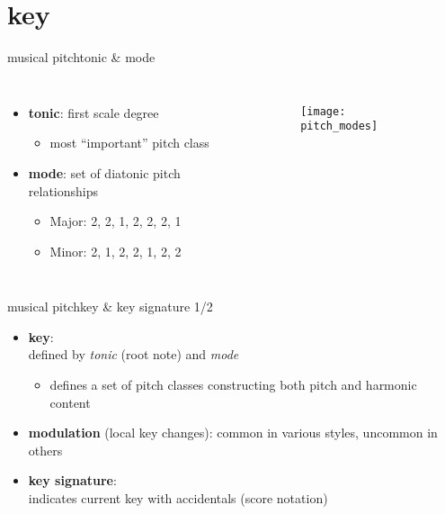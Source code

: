     \section{key}
        \begin{frame}{musical pitch}{tonic \& mode}
            \begin{columns}
            \begin{itemize}
                \item	\textbf{tonic}: first scale degree
                        \begin{itemize}
                            \item	most ``important'' pitch class
                        \end{itemize}
                
                \item	\textbf{mode}: set of diatonic pitch relationships
                        \begin{itemize}
                            \item	Major: 2, 2, 1, 2, 2, 2, 1
                            \item	Minor: 2, 1, 2, 2, 1, 2, 2
                        \end{itemize}
            \end{itemize}
                \vspace{-10mm}
                \begin{figure}[t]
                    \centering
                    \texttt{[image: pitch\_modes]}
                \end{figure}
            \end{columns}

        \end{frame}
        
        \begin{frame}{musical pitch}{key \& key signature 1/2}
            \begin{itemize}
                \item	\textbf{key}:\\ defined by \textit{tonic} (root note) and \textit{mode}
                        
                        \begin{itemize}
                            \item<1->	defines a set of pitch classes constructing both  pitch and harmonic content
                            
                        \end{itemize}
                \bigskip        
                \item<2->	\textbf{modulation} (local key changes): common in various styles, uncommon in others
                \bigskip        
                \item<3->	\textbf{key signature}:\\ indicates current key with accidentals (score notation)
            \end{itemize}
        \end{frame}
        
